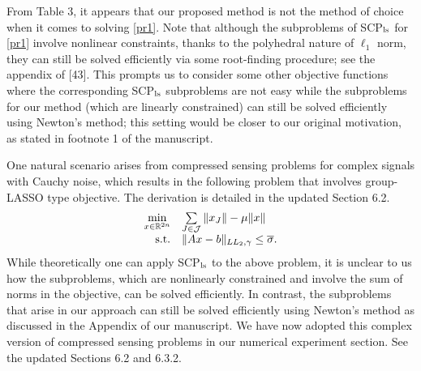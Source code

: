 \documentclass{article}
\def\R{\mathbb{R}}
\begin{document}
\begin{enumerate}
From Table 3, it appears that our proposed method is not the method of choice when it comes to solving \eqref{pr1}.
Note that although the subproblems of SCP$_{\rm ls}$ for \eqref{pr1} involve nonlinear constraints, thanks to the polyhedral nature of $\ell_1$ norm, they can still be solved efficiently via some root-finding procedure; see the appendix of [43]. This prompts us to consider some other objective functions where the corresponding SCP$_{\rm ls}$ subproblems are not easy while the subproblems for our method (which are linearly constrained) can still be solved efficiently using Newton's method; this setting would be closer to our original motivation, as stated in footnote 1 of the manuscript.

One natural scenario arises from compressed sensing problems for complex signals with Cauchy noise, which results in the following problem that involves group-LASSO type objective. The derivation is detailed in the updated Section 6.2.
\begin{equation}\label{E2}
  \begin{array}{rl}
    \min\limits_{x\in\R^{2n}} & \sum\limits_{J\in\mathcal{J}}\|x_J\| - \mu\|x\| \\
    {\rm s.t.} & \|Ax - b\|_{LL_2,\gamma}\leq \overline{\sigma}.
  \end{array}
\end{equation}
While theoretically one can apply SCP$_{\rm ls}$ to the above problem, it is unclear to us how the subproblems, which are nonlinearly constrained and involve the sum of norms in the objective, can be solved efficiently. In contrast, the subproblems that arise in our approach can still be solved efficiently using Newton's method as discussed in the Appendix of our manuscript. We have now adopted this complex version of compressed sensing problems in our numerical experiment section. See the updated Sections 6.2 and 6.3.2.
%

\end{enumerate}
\end{document}

